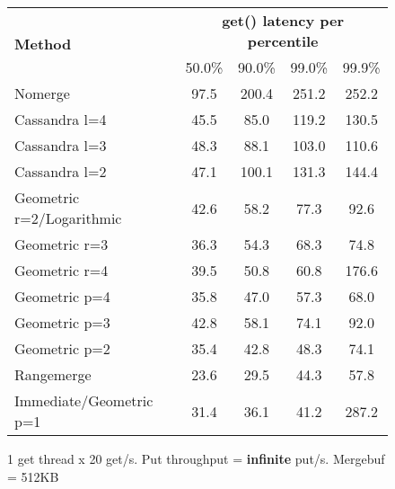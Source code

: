 \documentclass[11pt]{article}
\begin{document}
\begin{figure}[h]
\begin{center}
\begin{tabular}{|l|c|c|c|c|}
\hline
\multirow{2}{*}{\textbf{Method}} & \multicolumn{4}{c|}{\textbf{get() latency per percentile}} \\
                                 & 50.0\% & 90.0\% & 99.0\% & 99.9\% \\
\hline
\hline
Nomerge                   &  97.5 & 200.4 & 251.2 & 252.2 \\
\hline
Cassandra l=4             &  45.5 &  85.0 & 119.2 & 130.5 \\
\hline
Cassandra l=3             &  48.3 &  88.1 & 103.0 & 110.6 \\
\hline
Cassandra l=2             &  47.1 & 100.1 & 131.3 & 144.4 \\
\hline
Geometric r=2/Logarithmic &  42.6 &  58.2 &  77.3 &  92.6 \\
\hline
Geometric r=3             &  36.3 &  54.3 &  68.3 &  74.8 \\
\hline
Geometric r=4             &  39.5 &  50.8 &  60.8 & 176.6 \\
\hline
Geometric p=4             &  35.8 &  47.0 &  57.3 &  68.0 \\
\hline
Geometric p=3             &  42.8 &  58.1 &  74.1 &  92.0 \\
\hline
Geometric p=2             &  35.4 &  42.8 &  48.3 &  74.1 \\
\hline
Rangemerge                &  23.6 &  29.5 &  44.3 &  57.8 \\
\hline
Immediate/Geometric p=1   &  31.4 &  36.1 &  41.2 & 287.2 \\
\hline
\end{tabular} 
\caption{1 get thread x 20 get/s. Put throughput = \textbf{infinite} put/s. Mergebuf = 512KB}
\end{center}
\end{figure}

\end{document}
